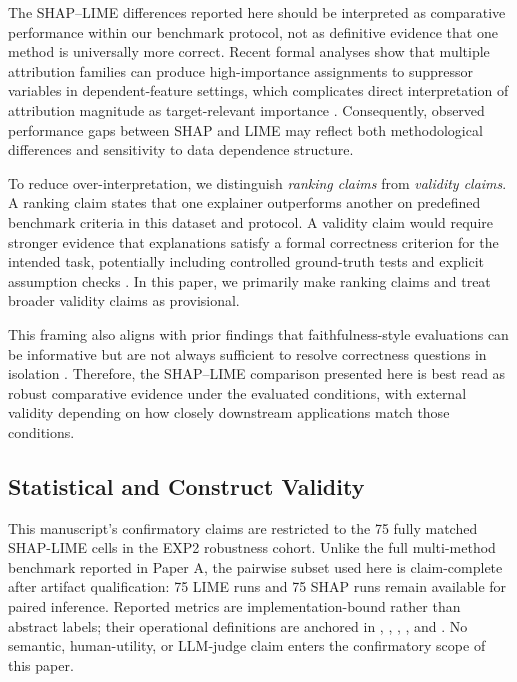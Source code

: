 \documentclass[twoside,11pt]{article}
\begin{document}
The SHAP--LIME differences reported here should be interpreted as comparative
performance within our benchmark protocol, not as definitive evidence that one
method is universally more correct. Recent formal analyses show that multiple
attribution families can produce high-importance assignments to suppressor
variables in dependent-feature settings, which complicates direct interpretation
of attribution magnitude as target-relevant importance
\citep{wilming2022scrutinizing,wilming2023theoretical,haufe2026formalization}.
Consequently, observed performance gaps between SHAP and LIME may reflect both
methodological differences and sensitivity to data dependence structure.

To reduce over-interpretation, we distinguish \emph{ranking claims} from
\emph{validity claims}. A ranking claim states that one explainer outperforms
another on predefined benchmark criteria in this dataset and protocol. A validity
claim would require stronger evidence that explanations satisfy a formal
correctness criterion for the intended task, potentially including controlled
ground-truth tests and explicit assumption checks
\citep{haufe2026formalization,doshivelez2017rigorous}. In this paper, we
primarily make ranking claims and treat broader validity claims as provisional.

This framing also aligns with prior findings that faithfulness-style evaluations
can be informative but are not always sufficient to resolve correctness questions
in isolation \citep{jacovi2020faithfulness,adebayo2018sanity,hooker2019benchmark,
rong2022consistent}. Therefore, the SHAP--LIME comparison presented here is best
read as robust comparative evidence under the evaluated conditions, with external
validity depending on how closely downstream applications match those conditions.

\subsection{Statistical and Construct Validity}
This manuscript's confirmatory claims are restricted to the 75 fully
matched SHAP-LIME cells in the EXP2 robustness cohort. Unlike the full
multi-method benchmark reported in Paper A, the pairwise subset used
here is claim-complete after artifact qualification: 75 LIME runs and
75 SHAP runs remain available for paired inference. Reported metrics are
implementation-bound rather than abstract labels; their operational
definitions are anchored in ,
, ,
, and . No
semantic, human-utility, or LLM-judge claim enters the confirmatory
scope of this paper.
\end{document}
